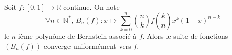 






  \begin{theorem}
    \label{theoreme-de-weierstrass-par-les-probabilites-1}
    Soit $f : [0,1] \rightarrow \mathbb{R}$ continue. On note
    \[ \forall n \in \mathbb{N}^*, \, B_n(f) : x \mapsto \sum_{k=0}^n \binom{n}{k} f \left( \frac{k}{n} \right) x^k (1-x)^{n-k} \]
    le $n$-ième polynôme de Bernstein associé à $f$. Alors le suite de fonctions $(B_n(f))$ converge uniformément vers $f$.
  \end{theorem}

